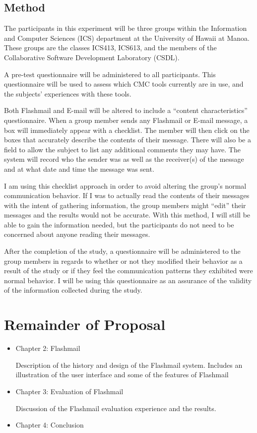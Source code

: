 \subsection{Method}
The participants in this experiment will be three groups within the
Information and Computer Sciences (ICS) department at the University of
Hawaii at Manoa. These groups are the classes ICS413, ICS613, and the
members of the Collaborative Software Development Laboratory (CSDL).

A pre-test questionnaire will be administered to all participants.  This
questionnaire will be used to assess which CMC tools currently are in use,
and the subjects' experiences with these tools.  

Both Flashmail and E-mail will be altered to include a ``content characteristics''
questionnaire. When a group member sends any Flashmail or E-mail message, a
box will immediately appear with a checklist.  The member will then 
click on the boxes that accurately describe the contents of their
message.  There will also be a field to allow the subject to list any
additional comments they may have.  The system will record who the sender
was as well as the receiver(s) of the message and at what date and time the
message was sent. 

I am using this checklist approach in order to avoid altering the group's
normal communication behavior.  If I was to actually read the contents of
their messages with the intent of gathering information, the group members
might ``edit'' their messages and the results would not be accurate.  With
this method, I will still be able to gain the information needed, but the
participants do not need to be concerned about anyone reading their
messages.  

After the completion of the study, a questionnaire will be administered to
the group members in regards to whether or not they modified their behavior
as a result of the study or if they feel the communication patterns they
exhibited were normal behavior. I will be using this questionnaire as
an assurance of the validity of the information collected during the study.

\section{Remainder of Proposal}
\begin{itemize}
\item Chapter 2: Flashmail

Description of the history and design of the Flashmail system.  Includes an 
illustration of the user interface and some of the features of Flashmail
\item Chapter 3: Evaluation of Flashmail

Discussion of the Flashmail evaluation experience and the results.
\item Chapter 4: Conclusion
\end{itemize}

